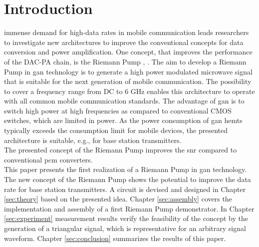 \documentclass[journal]{IEEEtran}
\begin{document}
\section{Introduction}
\label{sec:introduction}
 immense demand for high-data rates in mobile communication leads researchers to investigate new architectures to improve the conventional concepts
for data conversion and power amplification.
One concept, that improves the performance of the DAC-PA chain, is the Riemann Pump \cite{VeyracRivetDevalEtAl2014}, \cite{DevalRivetVeyrac2015}.
The aim to develop a Riemann Pump in \gls{gan} technology is to generate a high power modulated microwave signal that is suitable for the next generation of mobile communication.
The possibility to cover a frequency range from DC to 6 GHz enables this architecture to operate with all common mobile communication standards.
The advantage of \gls{gan} is to switch high power at high frequencies as compared to conventional CMOS switches, which are limited in power.
As the power consumption of \gls{gan} \glspl{hemt} typically exceeds the consumption limit for mobile devices, the presented architecture is suitable, e.g., for base station transmitters.\\
The presented concept of the Riemann Pump improves the \gls{snr} compared to conventional \gls{pcm} converters.
\\
This paper presents the first realization of a Riemann Pump in \gls{gan} technology.
The new concept of the Riemann Pump shows the potential to improve the data rate for base station transmitters.
A circuit is devised and designed in Chapter \ref{sec:theory} based on the presented idea.
Chapter \ref{sec:assembly} covers the implementation and assembly of a first Riemann Pump demonstrator.
In Chapter \ref{sec:experiment} measurement results verify the feasibility of the concept by the generation of a triangular signal, which is representative for an arbitrary signal waveform.
Chapter \ref{sec:conclusion} summarizes the results of this paper.
\end{document}
